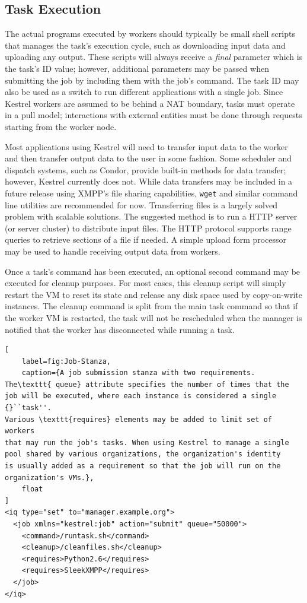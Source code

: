 \subsection{Task Execution}

\label{sec:Kestrel:Execution} The actual programs executed by workers
should typically be small shell scripts that manages the task's execution
cycle, such as downloading input data and uploading any output. These
scripts will always receive a \textit{final} parameter which is the
task's ID value; however, additional parameters may be passed when
submitting the job by including them with the job's command. The task
ID may also be used as a switch to run different applications with
a single job. Since Kestrel workers are assumed to be behind a NAT
boundary, tasks must operate in a pull model; interactions with external
entities must be done through requests starting from the worker node.

Most applications using Kestrel will need to transfer input data to
the worker and then transfer output data to the user in some fashion.
Some scheduler and dispatch systems, such as Condor, provide built-in
methods for data transfer; however, Kestrel currently does not. While
data transfers may be included in a future release using XMPP's file
sharing capabilities, \texttt{wget} and similar command line utilities
are recommended for now. Transferring files is a largely solved problem
with scalable solutions. The suggested method is to run a HTTP server
(or server cluster) to distribute input files. The HTTP protocol supports
range queries to retrieve sections of a file if needed. A simple upload
form processor may be used to handle receiving output data from workers.

Once a task's command has been executed, an optional second command
may be executed for cleanup purposes. For most cases, this cleanup
script will simply restart the VM to reset its state and release any
disk space used by copy-on-write instances. The cleanup command is
split from the main task command so that if the worker VM is restarted,
the task will not be rescheduled when the manager is notified that
the worker has disconnected while running a task.

\begin{lstlisting}[
    label=fig:Job-Stanza,
    caption={A job submission stanza with two requirements.
The\texttt{ queue} attribute specifies the number of times that the
job will be executed, where each instance is considered a single {}``task''.
Various \texttt{requires} elements may be added to limit set of workers
that may run the job's tasks. When using Kestrel to manage a single
pool shared by various organizations, the organization's identity
is usually added as a requirement so that the job will run on the
organization's VMs.},
    float
]
<iq type="set" to="manager.example.org"> 
  <job xmlns="kestrel:job" action="submit" queue="50000"> 
    <command>/runtask.sh</command> 
    <cleanup>/cleanfiles.sh</cleanup> 
    <requires>Python2.6</requires> 
    <requires>SleekXMPP</requires> 
  </job> 
</iq>
\end{lstlisting}


